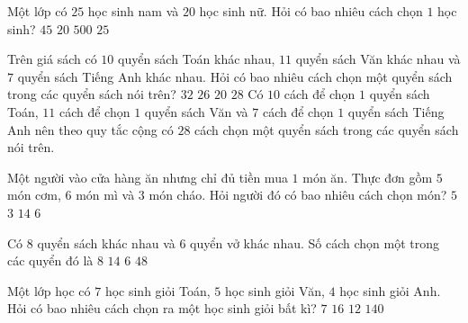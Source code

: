 \begin{ex}%
	Một lớp có $25$ học sinh nam và $20$ học sinh nữ. Hỏi có bao nhiêu cách chọn $1$ học sinh?
	\choice
	{\True $45$}
	{$20$}
	{$500$}
	{$25$}
\end{ex}

\begin{ex}%
	Trên giá sách có $10$ quyển sách Toán khác nhau, $11$ quyển sách Văn khác nhau và $7$ quyển sách Tiếng Anh khác nhau. Hỏi có bao nhiêu cách chọn một quyển sách trong các quyển sách nói trên?
	\choice
	{$32$}
	{$26$}
	{$20$}
	{\True $28$}
	\loigiai
	{Có $10$ cách để chọn $1$ quyển sách Toán, $11$ cách để chọn $1$ quyển sách Văn và $7$ cách để chọn $1$ quyển sách Tiếng Anh nên theo quy tắc cộng có $28$ cách chọn một quyển sách trong các quyển sách nói trên.}
\end{ex}

\begin{ex}%
	Một người vào cửa hàng ăn nhưng chỉ đủ tiền mua $1$ món ăn. Thực đơn gồm $5$ món cơm, $6$ món mì và $3$ món cháo. Hỏi người đó có bao nhiêu cách chọn món?
	\choice
	{$5$}
	{$3$}
	{\True $14$}
	{$6$}
\end{ex}

\begin{ex}%
	Có $8$ quyển sách khác nhau và $6$ quyển vở khác nhau. Số cách chọn một trong các quyển đó là
	\choice
	{$8$}
	{\True $14$}
	{$6$}
	{$48$}
\end{ex}

\begin{ex}%
	Một lớp học có $7$ học sinh giỏi Toán, $5$ học sinh giỏi Văn, $4$ học sinh giỏi Anh. Hỏi có bao nhiêu cách chọn ra một học sinh giỏi bất kì?
	\choice
	{$7 $}
	{\True$16 $}
	{$12 $}
	{$140 $}
\end{ex}


